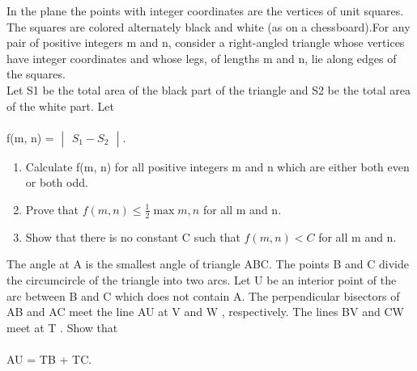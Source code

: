 \item In the plane the points with integer coordinates are the vertices of unit squares. The squares are colored alternately black and white (as on a chessboard).For any pair of positive integers m and n, consider a right-angled triangle whose vertices have integer coordinates and whose legs, of lengths m and n, lie along edges of the squares.\\
Let S1 be the total area of the black part of the triangle and S2 be the total area of the white part. Let\\
\\ f(m, n) = $\begin{vmatrix} S_1 - S_2 \end{vmatrix}$.
\begin{enumerate}
\item Calculate f(m, n) for all positive integers m and n which are either both even or both odd.
\item Prove that $f(m, n) \leq \frac{1}{2} \max{m, n}$ for all m and n.
\item Show that there is no constant C such that $f(m, n) < C$ for all m and n.
\end{enumerate}

\item The angle at A is the smallest angle of triangle ABC. The points B and C divide the circumcircle of the triangle into two arcs. Let U be an interior point of the arc between B and C which does not contain A. The perpendicular bisectors of AB and AC meet the line AU at V and W , respectively. The lines BV and CW meet at T . Show that\\
\\ AU = TB + TC.



